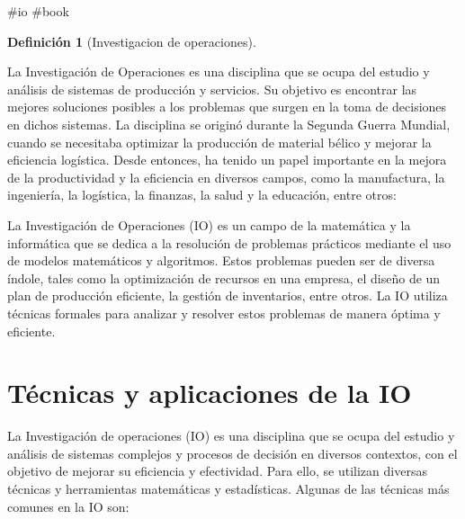 \documentclass[
  letterpaper,
  DIV=11,
  numbers=noendperiod]{scrreprt}
\theoremstyle{definition}
\theoremstyle{definition}
\newtheorem{definition}{Definición}[chapter]
\theoremstyle{remark}
\begin{document}
\#io \#book

\leavevmode{}%
\begin{definition}[Investigacion de operaciones]\label{def-io}

La Investigación de Operaciones es una disciplina que se ocupa del
estudio y análisis de sistemas de producción y servicios. Su objetivo es
encontrar las mejores soluciones posibles a los problemas que surgen en
la toma de decisiones en dichos sistemas. La disciplina se originó
durante la Segunda Guerra Mundial, cuando se necesitaba optimizar la
producción de material bélico y mejorar la eficiencia logística. Desde
entonces, ha tenido un papel importante en la mejora de la productividad
y la eficiencia en diversos campos, como la manufactura, la ingeniería,
la logística, la finanzas, la salud y la educación, entre otros:

\end{definition}

La Investigación de Operaciones (IO) es un campo de la matemática y la
informática que se dedica a la resolución de problemas prácticos
mediante el uso de modelos matemáticos y algoritmos. Estos problemas
pueden ser de diversa índole, tales como la optimización de recursos en
una empresa, el diseño de un plan de producción eficiente, la gestión de
inventarios, entre otros. La IO utiliza técnicas formales para analizar
y resolver estos problemas de manera óptima y eficiente.

\hypertarget{tuxe9cnicas-y-aplicaciones-de-la-io}{%
\section{Técnicas y aplicaciones de la
IO}\label{tuxe9cnicas-y-aplicaciones-de-la-io}}

La Investigación de operaciones (IO) es una disciplina que se ocupa del
estudio y análisis de sistemas complejos y procesos de decisión en
diversos contextos, con el objetivo de mejorar su eficiencia y
efectividad. Para ello, se utilizan diversas técnicas y herramientas
matemáticas y estadísticas. Algunas de las técnicas más comunes en la IO
son:
\end{document}
